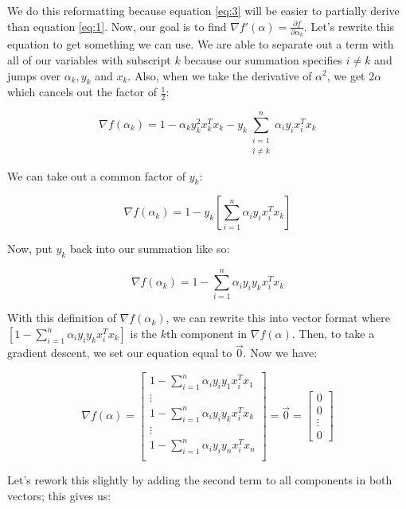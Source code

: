 We do this reformatting because equation \ref{eq:3} will be easier to partially derive than equation \ref{eq:1}. Now, our goal is to find $\nabla f'(\alpha) = \frac{\partial f}{\partial \alpha_k}$. Let's rewrite this equation to get something we can use. We are able to separate out a term with all of our variables with subscript $k$ because our summation specifies $i \ne k$ and jumps over $\alpha_k, y_k$ and $x_k$. Also, when we take the derivative of $\alpha^2$, we get $2\alpha$ which cancels out the factor of $\frac{1}{2}$:

\[
\nabla f(\alpha_k) = 1 - \alpha_ky_k^2x_k^Tx_k - y_k \sum_{\substack{i=1 \\ i \ne k}}^n \alpha_i y_i x_i^Tx_k
\]

We can take out a common factor of $y_k$:

\[
\nabla f(\alpha_k) = 1 - y_k [\sum\limits_{i=1}^{n} \alpha_iy_ix_i^Tx_k]
\]

Now, put $y_k$ back into our summation like so:

\[
\nabla f(\alpha_k) = 1 - \sum\limits_{i=1}^{n} \alpha_iy_iy_kx_i^Tx_k
\]

With this definition of $\nabla f(\alpha_k)$, we can rewrite this into vector format where $[1 - \sum\limits_{i=1}^{n} \alpha_iy_iy_kx_i^Tx_k]$ is the $k$th component in $\nabla f(\alpha)$. Then, to take a gradient descent, we set our equation equal to $\vec{0}$. Now we have: 

\begin{equation}
\nabla f(\alpha) = \begin{bmatrix}
        1 - \sum\limits_{i=1}^{n} \alpha_iy_iy_1x_i^Tx_1 \\
        \vdots \\
        1 - \sum\limits_{i=1}^{n} \alpha_iy_iy_kx_i^Tx_k \\
        \vdots \\
        1 - \sum\limits_{i=1}^{n} \alpha_iy_iy_nx_i^Tx_n \\
    \end{bmatrix} =
    \vec{0} = \begin{bmatrix}
    0\\
    0\\
    \vdots\\
    0
\end{bmatrix}
\end{equation}

Let's rework this slightly by adding the second term to all components in both vectors; this gives us:

